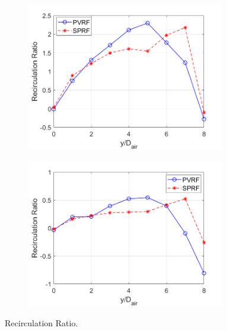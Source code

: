 \begin{figure}[h!]
	\begin{subfigure}[t]{0.5\textwidth}
	    \centering
            \includegraphics[width=0.95\textwidth]{Chapter5/Images/Numerical/Recirculation ratio/RR_NR.png}
    	\label{NonRecirRatio}
	\end{subfigure}
        \begin{subfigure}[t]{0.5\textwidth}
            \centering
            \includegraphics[width=0.95\textwidth]{Chapter5/Images/Numerical/Recirculation ratio/RR_R.png}
    	\label{RecirRatio}
        \end{subfigure}
\caption{Recirculation Ratio.}
\label{fig:Recirculation Ratio}
\end{figure}

